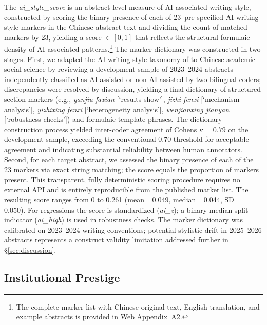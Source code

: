 \documentclass[12pt,a4paper]{article}
\begin{document}
The \textit{ai\_style\_score} is an abstract-level measure of AI-associated
writing style, constructed by scoring the binary presence of each of
23~pre-specified AI writing-style markers in the Chinese abstract text
and dividing the count of matched markers by 23, yielding a score
$\in[0,1]$ that reflects the structural-formulaic density of
AI-associated patterns.\footnote{The complete marker list with Chinese
  original text, English translation, and example abstracts is provided
  in Web Appendix~A2.}
The marker dictionary was constructed in two stages.
First, we adapted the AI writing-style taxonomy of \citet{Liang2024}
to Chinese academic social science by reviewing a development sample
of 2023--2024 abstracts independently classified as AI-assisted
or non-AI-assisted by two bilingual coders; discrepancies were resolved
by discussion, yielding a final dictionary of structured section-markers
(e.g., \textit{yanjiu faxian} [`results show'],
\textit{jizhi fenxi} [`mechanism analysis'],
\textit{yizhixing fenxi} [`heterogeneity analysis'],
\textit{wenjianxing jianyan} [`robustness checks'])
and formulaic template phrases.
The dictionary-construction process yielded inter-coder agreement of
Cohen\textquotesingle s $\kappa = 0.79$ on the development sample,
exceeding the conventional 0.70 threshold for acceptable agreement
and indicating substantial reliability between human annotators.
Second, for each target abstract, we assessed the binary presence of
each of the 23 markers via exact string matching; the score equals
the proportion of markers present.
This transparent, fully deterministic scoring procedure requires no
external API and is entirely reproducible from the published marker
list.
The resulting score ranges from 0 to 0.261
(mean\,=\,0.049, median\,=\,0.044, SD\,=\,0.050).
For regressions the score is standardized (\textit{ai\_z}); a binary
median-split indicator (\textit{ai\_high}) is used in robustness checks.
The marker dictionary was calibrated on 2023--2024 writing conventions;
potential stylistic drift in 2025--2026 abstracts represents a
construct validity limitation addressed further in §\ref{sec:discussion}.

\subsection{Institutional Prestige}
\end{document}

